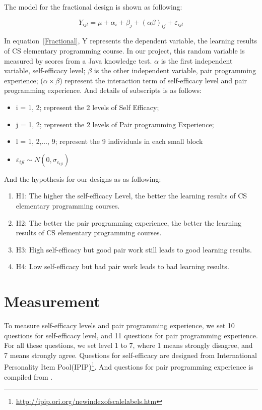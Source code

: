 \documentclass{sigchi}
\begin{document}
The model for the fractional design is shown as following:

\begin{equation}
\label{Fractional}
Y_{ijl} = \mu + \alpha_i + \beta_j + (\alpha \beta)_{ij} + \varepsilon_{ijl}
\end{equation}

In equation~\eqref{Fractional},   Y represents the dependent variable, the learning results of CS elementary programming course. In our project, this random variable is measured by scores from a Java knowledge test. $\alpha$ is the first independent variable, self-efficacy level;  $\beta$ is the other independent variable, pair programming experience; ($\alpha \times \beta$) represent the interaction term of self-efficacy level and pair programming experience. And details of subscripts is as follows:

\begin{itemize}
\item i = 1, 2; represent the 2 levels of Self Efficacy; 
\item j = 1, 2; represent the 2 levels of Pair programming Experience;
\item l = 1, 2,$\dots$, 9; represent the 9 individuals in each small block
\item $\varepsilon_{ijl} \sim  N(0, \sigma_{\varepsilon_{ijl}})$
\end{itemize}

And the hypothesis for our designs as as following:

\begin{enumerate}
\item H1: The higher the self-efficacy Level, the better the learning results of CS elementary programming courses. 
\item H2: The better the pair programming experience, the better the learning results of CS elementary programming courses. 
\item H3: High self-efficacy but good pair work still leads to good learning results.
\item H4: Low self-efficacy but bad pair work leads to bad learning results.
\end{enumerate}


\section{Measurement}
To measure self-efficacy levels and pair programming experience,
we set 10 questions for self-efficacy level, and 11 questions for pair programming experience. For all these questions, we set level 1 to 7, where 1 means strongly disagree, and 7 means strongly agree. Questions for self-efficacy are designed from International Personality Item Pool(IPIP)\footnote{\url{http://ipip.ori.org/newindexofscalelabels.htm}}. And questions for pair programming experience is compiled from \cite{salleh2014investigating}.
\end{document}
